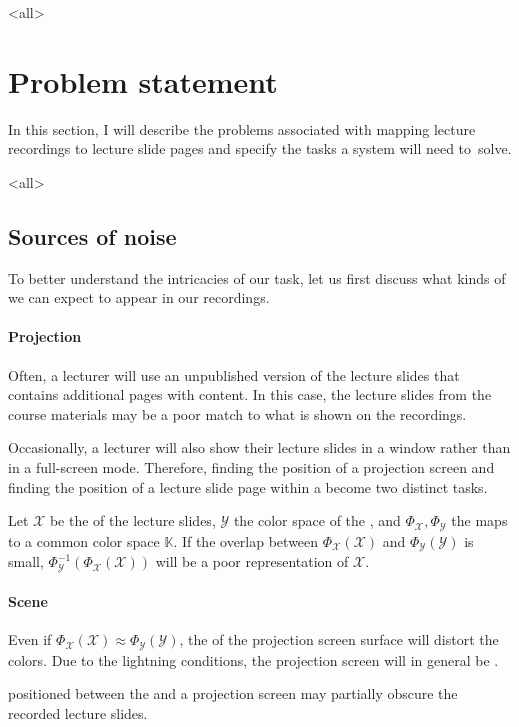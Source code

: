 \mode
<all>{%
\section{Problem statement}
\label{sec:problem}}
In this section, I will describe the problems associated with mapping lecture
recordings to lecture slide pages and specify the tasks a system will need
to~solve.

\mode
<all>{%
\subsection{Sources of noise}
\label{sec:noise}}
To better understand the intricacies of our task, let us first discuss what
kinds of  we can expect to appear in our recordings.

\paragraph{Projection} Often, a lecturer will use an unpublished version of the
lecture slides that contains additional pages with 
content. In this case, the lecture slides from the course materials may be a
poor match to what is shown on the recordings.

Occasionally, a lecturer will also show their lecture slides in a window rather
than in a full-screen mode. Therefore, finding the position of a projection
screen and finding the position of a lecture slide page within a
 become two distinct tasks.

Let $\mathcal X$ be the  of the lecture slides, $\mathcal Y$
the color space of the , and $\Phi_{\mathcal X},\Phi_{\mathcal
Y}$ the maps to a common color space $\mathbb K$. If the overlap between
$\Phi_{\mathcal X}(\mathcal X)$ and $\Phi_{\mathcal Y}(\mathcal Y)$ is small,
$\Phi^{-1}_{\mathcal Y}(\Phi_{\mathcal X}(\mathcal X))$ will be a poor
representation of $\mathcal X$.

\paragraph{Scene} Even if $\Phi_{\mathcal X}(\mathcal X)\approx\Phi_{\mathcal
Y}(\mathcal Y)$, the  of the projection screen surface will
distort the colors. Due to the lightning conditions, the projection screen
will in general be .

 positioned between the  and a projection
screen may partially obscure the recorded lecture slides.

